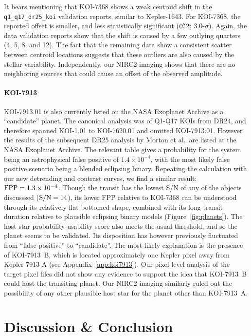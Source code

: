 \documentclass[12pt,twocolumn]{aastex63}
\begin{document}
It bears mentioning that KOI-7368 shows a weak centroid shift in the
\texttt{q1\_q17\_dr25\_koi} validation reports, similar to
Kepler-1643.  For KOI-7368, the reported offset is smaller, and less
statistically significant ($0\mbox{$.\!\!^{\prime\prime}$}2$; 3.0-$\sigma$).  Again, the data
validation reports show that the shift is caused by a few outlying
quarters (4, 5, 8, and 12).  The fact that the remaining data show a
consistent scatter between centroid locations suggests that these
outliers are also caused by the stellar variability.  Independently,
our NIRC2 imaging shows that there are no neighboring sources that
could cause an offset of the observed amplitude.

\paragraph{KOI-7913}
KOI-7913.01 is also currently listed on the NASA Exoplanet Archive as a
``candidate'' planet.  The canonical \citet{morton_false_2016}
analysis was of Q1-Q17 KOIs from DR24, and therefore spanned KOI-1.01
to KOI-7620.01 and omitted KOI-7913.01.  However the results of the
subsequent DR25 analysis by Morton et al.\ are listed at the NASA
Exoplanet Archive.  The relevant table gives a probability for the
system being an astrophysical false positive of $1.4\times10^{-4}$,
with the most likely false positive scenario being a blended eclipsing
binary.  Repeating the calculation with our new detrending and
contrast curves, we find a similar result: ${\rm FPP} =
1.3\times10^{-4}$.  Though the transit has the lowest S/N of any of
the objects discusssed (${\rm S/N}=14$), its lower FPP relative to
KOI-7368 can be understood through its relatively flat-bottomed shape,
combined with its long transit duration relative to plausible
eclipsing binary models (Figure~\ref{fig:planets}).  The host star
probability usability score \citep{2017ksci.rept...16B} also meets the
usual threshold, and so the planet seems to be validated.  Its
disposition has however previously fluctuated from ``false positive''
to ``candidate''.  The most likely explanation is the presence of
KOI-7913~B, which is located approximately one Kepler pixel away from
Kepler-7913 A (see Appendix~\ref{app:koi7913}).  Our pixel-level
analysis of the target pixel files did not show any evidence to
support the idea that KOI-7913~B could host the transiting planet.
Our NIRC2 imaging similarly ruled out the possibility of any other
plausible host star for the planet other than KOI-7913~A.


\section{Discussion \& Conclusion}
\label{sec:disc_conc}
\end{document}
